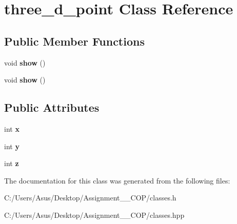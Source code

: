 \hypertarget{classthree__d__point}{}\section{three\+\_\+d\+\_\+point Class Reference}
\label{classthree__d__point}
\subsection*{Public Member Functions}
\begin{DoxyCompactItemize}
\item 
\mbox{\label{classthree__d__point_afe9856f45b96c99be42df6f295885eca}} 
void {\bfseries show} ()
\item 
\mbox{\label{classthree__d__point_afe9856f45b96c99be42df6f295885eca}} 
void {\bfseries show} ()
\end{DoxyCompactItemize}
\subsection*{Public Attributes}
\begin{DoxyCompactItemize}
\item 
\mbox{\label{classthree__d__point_a946b97267737c81434c5656e0f0a45bd}} 
int {\bfseries x}
\item 
\mbox{\label{classthree__d__point_a19bf1ab0a8473e51c970fa2b4c3d1dd1}} 
int {\bfseries y}
\item 
\mbox{\label{classthree__d__point_a64a0e5af14c4e5f08cc299ade3dfc8fd}} 
int {\bfseries z}
\end{DoxyCompactItemize}


The documentation for this class was generated from the following files\+:\begin{DoxyCompactItemize}
\item 
C\+:/\+Users/\+Asus/\+Desktop/\+Assignment\+\_\+\_\+\+C\+O\+P/classes.\+h\item 
C\+:/\+Users/\+Asus/\+Desktop/\+Assignment\+\_\+\_\+\+C\+O\+P/classes.\+hpp\end{DoxyCompactItemize}
